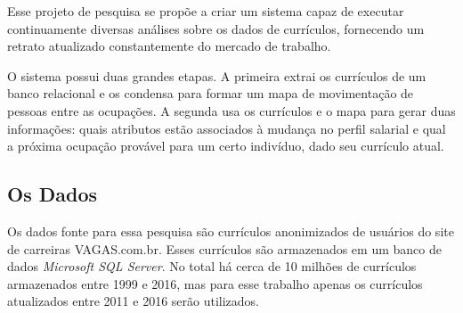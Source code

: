 \documentclass[12pt,a4paper]{article}
\begin{document}

Esse projeto de pesquisa se propõe a criar um sistema capaz de executar continuamente diversas análises sobre os dados de currículos, fornecendo um retrato atualizado constantemente do mercado de trabalho.

O sistema possui duas grandes etapas. A primeira extrai os currículos de um banco relacional e os condensa para formar um mapa de movimentação de pessoas entre as ocupações. A segunda usa os currículos e o mapa para gerar duas informações: quais atributos estão associados à mudança no perfil salarial e qual a próxima ocupação provável para um certo indivíduo, dado seu currículo atual.






\subsection{Os Dados}

Os dados fonte para essa pesquisa são currículos anonimizados de usuários do site de carreiras VAGAS.com.br. Esses currículos são armazenados em um banco de dados \textit{Microsoft SQL Server}. No total há cerca de 10 milhões de currículos armazenados entre 1999 e 2016, mas para esse trabalho apenas os currículos atualizados entre 2011 e 2016 serão utilizados. %
\end{document}
